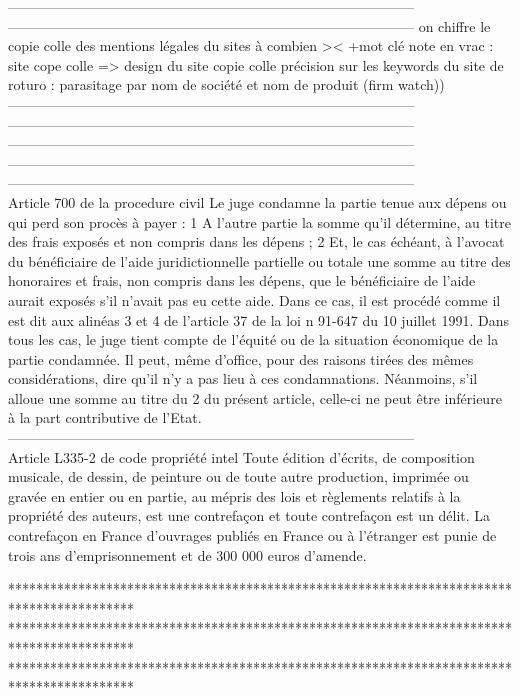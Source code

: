 ---------------------------------------------------------------------------------------
---------------------------------------------------------------------------------------
on chiffre le copie colle des mentions légales du sites à combien >< +mot clé
note en vrac : site cope colle => design du site copie colle
précision sur les keywords du site de roturo : parasitage par nom de société et nom de produit (firm watch))
---------------------------------------------------------------------------------------
---------------------------------------------------------------------------------------
---------------------------------------------------------------------------------------
---------------------------------------------------------------------------------------
---------------------------------------------------------------------------------------\\
Article 700 de la procedure civil
Le juge condamne la partie tenue aux dépens ou qui perd son procès à payer :
1 A l'autre partie la somme qu'il détermine, au titre des frais exposés et non compris dans les
dépens ;
2 Et, le cas échéant, à l'avocat du bénéficiaire de l'aide juridictionnelle partielle ou totale une
somme au titre des honoraires et frais, non compris dans les dépens, que le bénéficiaire de l'aide
aurait exposés s'il n'avait pas eu cette aide. Dans ce cas, il est procédé comme il est dit aux alinéas 3
et 4 de l'article 37 de la loi n 91-647 du 10 juillet 1991.
Dans tous les cas, le juge tient compte de l'équité ou de la situation économique de la partie
condamnée. Il peut, même d'office, pour des raisons tirées des mêmes considérations, dire qu'il n'y a
pas lieu à ces condamnations. Néanmoins, s'il alloue une somme au titre du 2 du présent article,
celle-ci ne peut être inférieure à la part contributive de l'Etat.
---------------------------------------------------------------------------------------\\
Article L335-2 de code propriété intel
Toute édition d'écrits, de composition musicale, de dessin, de peinture ou de toute autre production,
imprimée ou gravée en entier ou en partie, au mépris des lois et règlements relatifs à la propriété des
auteurs, est une contrefaçon et toute contrefaçon est un délit.
La contrefaçon en France d'ouvrages publiés en France ou à l'étranger est punie de trois ans
d'emprisonnement et de 300 000 euros d'amende.


******************************************************************************************
******************************************************************************************
******************************************************************************************


